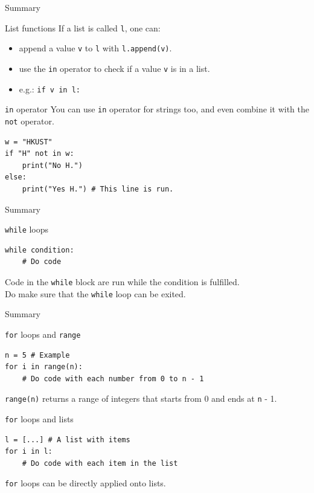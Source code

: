 \documentclass[dvipsnames, svgnames, x11names, handout]{beamer}
\begin{document}
\begin{frame}[fragile]{Summary}
\begin{block}{List functions}
If a list is called \texttt{l}, one can:
\begin{itemize}
    \item append a value \texttt{v} to \texttt{l} with \texttt{l.append(v)}.
    \item use the \texttt{in} operator to check if a value \texttt{v} is in a list.
    \item[] e.g.: \texttt{if v in l:}
\end{itemize}
\end{block}

\begin{block}{\texttt{in} operator}
You can use \texttt{in} operator for strings too, and even combine it with the \texttt{not} operator.
\begin{verbatim}
w = "HKUST"
if "H" not in w:
    print("No H.")
else:
    print("Yes H.") # This line is run.
\end{verbatim}
\end{block}
\end{frame}

\begin{frame}[fragile]{Summary}
\begin{block}{\texttt{while} loops}
\begin{verbatim}
while condition:
    # Do code
\end{verbatim}
Code in the \texttt{while} block are run while the condition is fulfilled.\\
Do make sure that the \texttt{while} loop can be exited.
\end{block}
\end{frame}

\begin{frame}[fragile]{Summary}
\begin{block}{\texttt{for} loops and \texttt{range}}
\begin{verbatim}
n = 5 # Example
for i in range(n):
    # Do code with each number from 0 to n - 1
\end{verbatim}
\texttt{range(n)} returns a range of integers that starts from 0 and ends at \texttt{n} - 1.
\end{block}

\begin{block}{\texttt{for} loops and lists}
\begin{verbatim}
l = [...] # A list with items
for i in l:
    # Do code with each item in the list
\end{verbatim}
\texttt{for} loops can be directly applied onto lists.
\end{block}
\end{frame}
\end{document}
